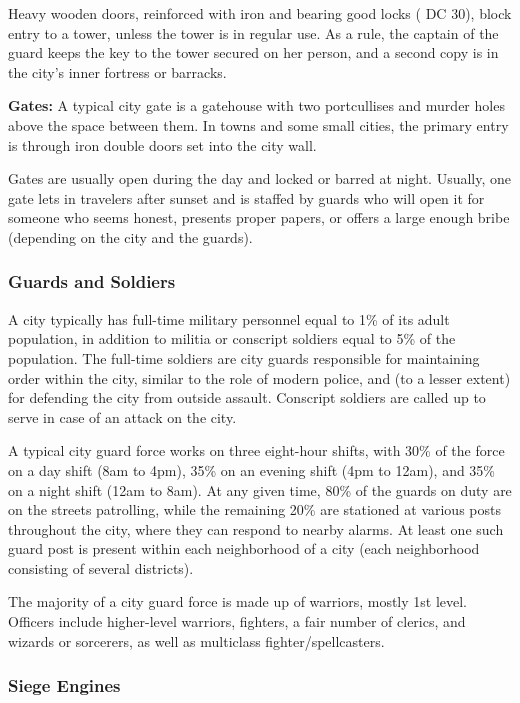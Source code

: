 Heavy wooden doors, reinforced with iron and bearing good locks ( DC 30), 
block entry to a tower, unless the tower is in regular use. As a rule, the captain 
of the guard keeps the key to the tower secured on her person, and a second copy 
is in the city's inner fortress or barracks.

\textbf{Gates:} A typical city gate is a gatehouse with two portcullises and murder 
holes above the space between them. In towns and some small cities, the primary 
entry is through iron double doors set into the city wall.

Gates are usually open during the day and locked or barred at night. Usually, one 
gate lets in travelers after sunset and is staffed by guards who will open it for 
someone who seems honest, presents proper papers, or offers a large enough bribe 
(depending on the city and the guards).

\subsubsection{Guards and Soldiers}

A city typically has full-time military personnel equal to 1\% of its adult population, 
in addition to militia or conscript soldiers equal to 5\% of the population. The 
full-time soldiers are city guards responsible for maintaining order within the 
city, similar to the role of modern police, and (to a lesser extent) for defending 
the city from outside assault. Conscript soldiers are called up to serve in case 
of an attack on the city.

A typical city guard force works on three eight-hour shifts, with 30\% of the force 
on a day shift (8am to 4pm), 
35\% on an evening shift (4pm to 12am), 
and 35\% on a night shift (12am to 8am). 
At any given time, 80\% of the guards on duty are on the streets patrolling, while 
the remaining 20\% are stationed at various posts throughout the city, where they 
can respond to nearby alarms. At least one such guard post is present within each 
neighborhood of a city (each neighborhood consisting of several districts).

The majority of a city guard force is made up of warriors, mostly 1st level. Officers 
include higher-level warriors, fighters, a fair number of clerics, and wizards 
or sorcerers, as well as multiclass fighter/spellcasters.

\subsubsection{Siege Engines}

